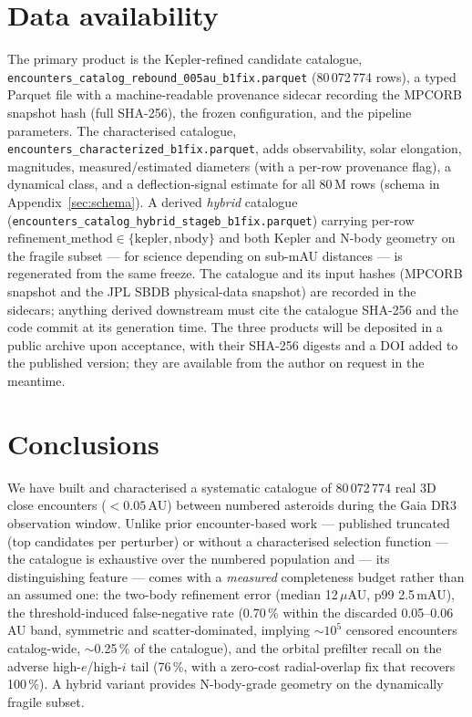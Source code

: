 \documentclass{aa}
\begin{document}
\section{Data availability}
\label{sec:data}

The primary product is the Kepler-refined candidate catalogue,
\texttt{encounters\_catalog\_rebound\_005au\_b1fix.parquet} (80\,072\,774 rows),
a typed Parquet file with a machine-readable provenance sidecar recording the
MPCORB snapshot hash (full SHA-256), the frozen configuration, and the pipeline
parameters. The characterised catalogue,
\texttt{encounters\_characterized\_b1fix.parquet}, adds observability, solar
elongation, magnitudes, measured/estimated diameters (with a per-row provenance
flag), a dynamical class, and a deflection-signal estimate for all 80\,M rows
(schema in Appendix~\ref{sec:schema}). A derived \emph{hybrid} catalogue
(\texttt{encounters\_catalog\_hybrid\_stageb\_b1fix.parquet}) carrying
per-row $\mathrm{refinement\_method}\in\{\mathrm{kepler},\mathrm{nbody}\}$ and
both Kepler and N-body geometry on the fragile subset --- for science depending
on sub-mAU distances --- is regenerated from the same freeze. The catalogue and
its input hashes (MPCORB snapshot and the JPL SBDB physical-data snapshot) are
recorded in the sidecars; anything derived downstream must cite the catalogue
SHA-256 and the code commit at its generation time. The three products will be
deposited in a public archive upon acceptance, with their SHA-256 digests and a
DOI added to the published version; they are available from the author on request
in the meantime.

\section{Conclusions}
\label{sec:conclusions}

We have built and characterised a systematic catalogue of 80\,072\,774 real 3D
close encounters ($<0.05$\,AU) between numbered asteroids during the Gaia DR3
observation window. Unlike prior encounter-based work --- published truncated
(top candidates per perturber) or without a characterised selection function ---
the catalogue is exhaustive over the numbered population and ---
its distinguishing feature --- comes with a \emph{measured} completeness budget
rather than an assumed one: the two-body refinement error (median 12\,$\mu$AU,
p99 2.5\,mAU), the threshold-induced false-negative rate (0.70\,\% within the
discarded 0.05--0.06\,AU band, symmetric and scatter-dominated, implying
$\sim$$10^5$ censored encounters catalog-wide, $\sim$0.25\,\% of the catalogue),
and the orbital prefilter recall on the adverse high-$e$/high-$i$ tail (76\,\%,
with a zero-cost radial-overlap fix that recovers 100\,\%). A hybrid variant
provides N-body-grade geometry on the dynamically fragile subset.
\end{document}
